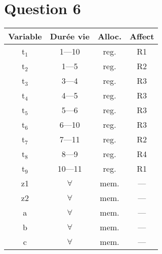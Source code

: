 \documentclass[class=article]{standalone}
\begin{document}
\section*{Question 6}
\begin{center}
  \begin{tabular}{|c|c|c|c|}
    \hline
      {\bf Variable} & {\bf Durée vie} & {\bf Alloc.} & {\bf Affect}\\
      \hline
      t$_1$          & 1---10          & reg.         & R1\\
      t$_2$          & 1---5           & reg.         & R2\\
      t$_3$          & 3---4           & reg.         & R3\\
      t$_4$          & 4---5           & reg.         & R3\\
      t$_5$          & 5---6           & reg.         & R3\\
      t$_6$          & 6---10          & reg.         & R3\\
      t$_7$          & 7---11          & reg.         & R2\\
      t$_8$          & 8---9           & reg.         & R4\\
      t$_9$          & 10---11         & reg.         & R1\\
      z1             & $\forall$       & mem.         & ---\\
      z2             & $\forall$       & mem.         & ---\\
      a              & $\forall$       & mem.         & ---\\
      b              & $\forall$       & mem.         & ---\\
      c              & $\forall$       & mem.         & ---\\
      \hline
  \end{tabular}
\end{center}
\end{document}
